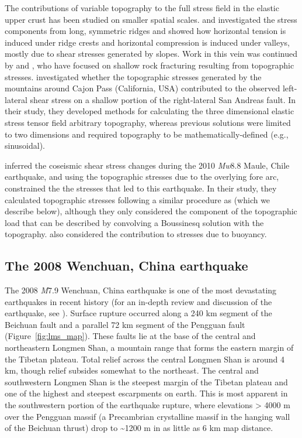 \documentclass[twocolumn,jgrga]{AGUTeX}
\begin{document}
\begin{article}
The contributions of variable topography to the full stress field in the
elastic upper crust has been studied on smaller spatial scales. 
\citet{mctiguemei1981} and
\citet{savageswolfs1986} investigated the stress components from long,
symmetric ridges and showed how horizontal tension is induced under
ridge crests and horizontal compression is induced under valleys, mostly
due to shear stresses generated by slopes. Work in this vein was
continued by \citet{millerdunne1996} and \citet{martel2006}, who have 
focused on shallow rock fracturing
resulting from topographic stresses. \citet{liuzoback1992} investigated 
whether the topographic stresses
generated by the mountains around Cajon Pass (California, USA)
contributed to the observed left-lateral shear stress on a shallow
portion of the right-lateral San Andreas fault. In their study, they
developed methods for calculating the three dimensional elastic stress
tensor field arbitrary topography, whereas previous solutions were limited
to two dimensions and required topography to be mathematically-defined
(e.g., sinusoidal).

\citet{luttrell2011} inferred the coseismic shear stress
changes during the 2010 \emph{Mw}8.8 Maule, Chile earthquake, and using
the topographic stresses due to the overlying fore arc, constrained the
the stresses that led to this earthquake. In their study, they
calculated topographic stresses following a similar procedure as
\citet{liuzoback1992} (which we describe below), although
they only considered the component of the topographic load that can be
described by convolving a Boussinesq solution with the topography.
\citet{luttrell2011} also considered the contribution to
stresses due to buoyancy.

\subsection{The 2008 Wenchuan, China
earthquake}\label{the-2008-wenchuan-china-earthquake}

The 2008 \emph{M}7.9 Wenchuan, China earthquake is one of the most
devastating earthquakes in recent history (for an in-depth review and
discussion of the earthquake, see \citet{zhang2010}).
Surface rupture occurred along a 240 km segment of the Beichuan fault
and a parallel 72 km segment of the Pengguan fault \citep{xu2009} 
(Figure~\ref{fig:lms_map}). These faults lie at the base of the central and
northeastern Longmen Shan, a mountain range that forms the eastern
margin of the Tibetan plateau. Total relief across the central Longmen
Shan is around 4 km, though relief subsides somewhat to the northeast.
The central and southwestern Longmen Shan is the steepest margin of the
Tibetan plateau \citep{clarkroyden2000} and one of the highest and
steepest escarpments on earth. This is most apparent in the southwestern
portion of the earthquake rupture, where elevations \textgreater{} 4000
m over the Pengguan massif (a Precambrian crystalline massif in the
hanging wall of the Beichuan thrust) drop to \textasciitilde{}1200 m in
as little as 6 km map distance.


\end{article}
\end{document}
